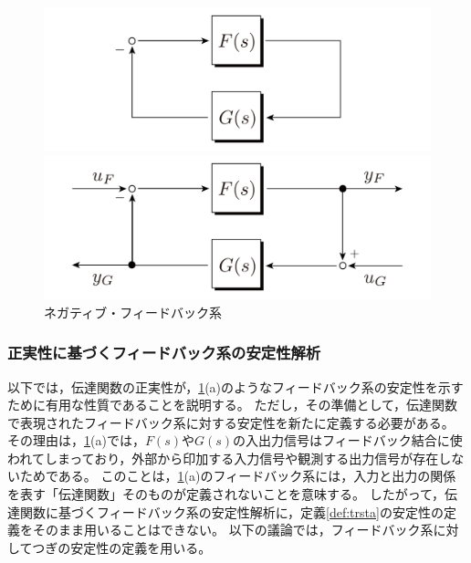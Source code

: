\documentclass[tombow,dvipdfmx]{corona-a5}
\begin{document}
\begin{figure}[t]
  \centering
  {
  \begin{minipage}{0.49\linewidth}
    \centering
    \includegraphics[width = .99\linewidth]{figs/staFG}
    \subcaption{ }
  \end{minipage}
  \begin{minipage}{0.49\linewidth}
    \centering
    \includegraphics[width = .99\linewidth]{figs/staFGIO}
    \subcaption{ }
  \end{minipage}
  \caption{ネガティブ・フィードバック系}
  \label{fig:staFG}
  }
\end{figure}



\subsubsection{正実性に基づくフィードバック系の安定性解析}

以下では，伝達関数の正実性が，\ref{fig:staFG}(a)のようなフィードバック系の安定性を示すために有用な性質であることを説明する。
ただし，その準備として，伝達関数で表現されたフィードバック系に対する安定性を新たに定義する必要がある。
その理由は，\ref{fig:staFG}(a)では，$F(s)$や$G(s)$の入出力信号はフィードバック結合に使われてしまっており，外部から印加する入力信号や観測する出力信号が存在しないためである。
このことは，\ref{fig:staFG}(a)のフィードバック系には，入力と出力の関係を表す「伝達関数」そのものが定義されないことを意味する。
したがって，伝達関数に基づくフィードバック系の安定性解析に，定義\ref{def:trsta}の安定性の定義をそのまま用いることはできない。
以下の議論では，フィードバック系に対してつぎの安定性の定義を用いる。
\end{document}

